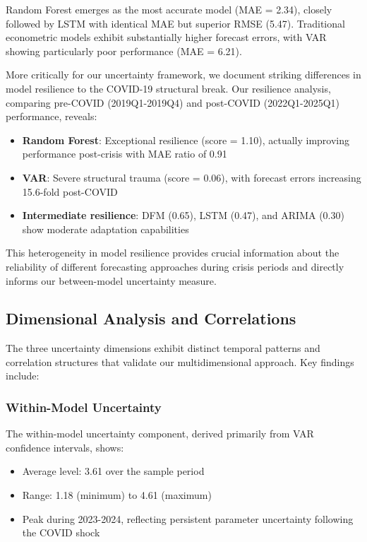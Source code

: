 \documentclass[5p,authoryear]{elsarticle}
\begin{document}
Random Forest emerges as the most accurate model (MAE = 2.34), closely followed by LSTM with identical MAE but superior RMSE (5.47). Traditional econometric models exhibit substantially higher forecast errors, with VAR showing particularly poor performance (MAE = 6.21).

More critically for our uncertainty framework, we document striking differences in model resilience to the COVID-19 structural break. Our resilience analysis, comparing pre-COVID (2019Q1-2019Q4) and post-COVID (2022Q1-2025Q1) performance, reveals:

\begin{itemize}
    \item \textbf{Random Forest}: Exceptional resilience (score = 1.10), actually improving performance post-crisis with MAE ratio of 0.91
    \item \textbf{VAR}: Severe structural trauma (score = 0.06), with forecast errors increasing 15.6-fold post-COVID
    \item \textbf{Intermediate resilience}: DFM (0.65), LSTM (0.47), and ARIMA (0.30) show moderate adaptation capabilities
\end{itemize}

This heterogeneity in model resilience provides crucial information about the reliability of different forecasting approaches during crisis periods and directly informs our between-model uncertainty measure.

\subsection{Dimensional Analysis and Correlations}

The three uncertainty dimensions exhibit distinct temporal patterns and correlation structures that validate our multidimensional approach. Key findings include:

\subsubsection{Within-Model Uncertainty}
The within-model uncertainty component, derived primarily from VAR confidence intervals, shows:
\begin{itemize}
    \item Average level: 3.61 over the sample period
    \item Range: 1.18 (minimum) to 4.61 (maximum)
    \item Peak during 2023-2024, reflecting persistent parameter uncertainty following the COVID shock
\end{itemize}
\end{document}
